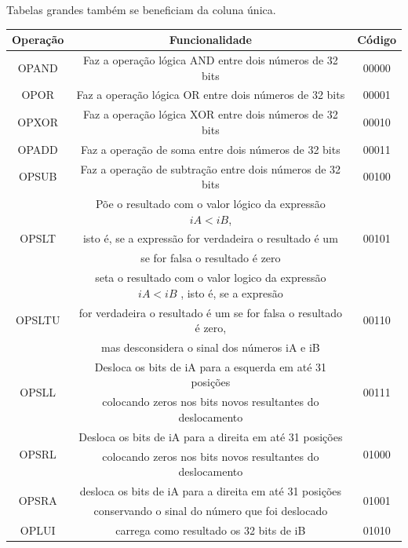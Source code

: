 \documentclass[9pt, twocolumn]{extarticle}
\begin{document}
		Tabelas grandes também se beneficiam da coluna única.
		
		\begin{table}[H]\centering
			\def\arraystretch{1.2}
			\begin{tabular}{|c|c|c|}
				\hline
				Operação & Funcionalidade & Código\\
				\hline\hline
				OPAND & Faz a operação lógica AND entre dois números de 32 bits & 00000\\
				\hline
				OPOR & Faz a operação lógica OR entre dois números de 32 bits & 00001\\
				\hline
				OPXOR & Faz a operação lógica XOR entre dois números de 32 bits & 00010\\
				\hline
				OPADD & Faz a operação de soma entre dois números de 32 bits & 00011\\
				\hline
				OPSUB & Faz a operação de subtração entre dois números de 32 bits & 00100\\
				\hline
				& Põe o resultado com o valor lógico da expressão $iA < iB$, &\\
				OPSLT & isto é, se a expressão for verdadeira o resultado é um & 00101 \\
				&se for falsa o resultado é zero &\\
				\hline
				& seta o resultado com o valor logico da expressão $iA < iB$ , isto é, se a expresão & \\
				OPSLTU & for verdadeira o resultado é um se for falsa o resultado é zero, & 00110\\
				& mas desconsidera o sinal dos números iA e iB &\\
				\hline
				\multirow{2}{*}{OPSLL} & Desloca os bits de iA para a esquerda em até 31 posições & 
				\multirow{2}{*}{00111}\\
				& colocando zeros nos bits novos resultantes do deslocamento &\\
				\hline
				\multirow{2}{*}{OPSRL} & Desloca os bits de iA para a direita em até 31 posições & 
				\multirow{2}{*}{01000}\\
				& colocando zeros nos bits novos resultantes do deslocamento &\\
				\hline
				\multirow{2}{*}{OPSRA}  & desloca os bits de iA para a direita em até 31 posições & \multirow{2}{*}{01001}\\
				& conservando o sinal do número que foi deslocado &\\
				\hline
				OPLUI & carrega como resultado os 32 bits de iB & 01010\\

\end{tabular}
\end{table}
\end{document}
